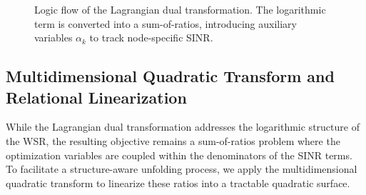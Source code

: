 \documentclass[journal]{IEEEtran}
\begin{document}
\begin{figure}[!t]
\centering
{}
\caption{Logic flow of the Lagrangian dual transformation. The logarithmic term is converted into a sum-of-ratios, introducing auxiliary variables $\alpha_k$ to track node-specific SINR.}
\label{fig:lagrangian_logic}
\end{figure}

\subsection{Multidimensional Quadratic Transform and Relational Linearization}
\label{subsec:quadratic_transform}

While the Lagrangian dual transformation addresses the logarithmic structure of the WSR, the resulting objective remains a sum-of-ratios problem where the optimization variables are coupled within the denominators of the SINR terms. To facilitate a structure-aware unfolding process, we apply the multidimensional quadratic transform to linearize these ratios into a tractable quadratic surface.
\end{document}
